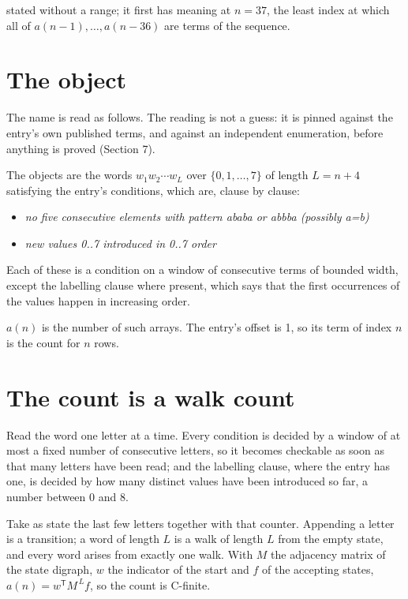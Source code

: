 \documentclass[11pt]{article}
\theoremstyle{definition}
\begin{document}
stated without a range; it first has meaning at $n = 37$, the least index at which all of $a(n-1),\dots,a(n-36)$ are terms of the sequence.

\section{The object}

The name is read as follows. The reading is not a guess: it is pinned against the entry's own published terms, and against an independent enumeration, before anything is proved (Section 7).

The objects are the words $w_1 w_2 \cdots w_L$ over $\{0,1,\dots,7\}$ of length $L = n + 4$ satisfying the entry's conditions, which are, clause by clause:

\begin{itemize}

\item {\itshape no five consecutive elements with pattern ababa or abbba (possibly a=b)}

\item {\itshape new values 0..7 introduced in 0..7 order}

\end{itemize}

Each of these is a condition on a window of consecutive terms of bounded width, except the labelling clause where present, which says that the first occurrences of the values happen in increasing order.

$a(n)$ is the number of such arrays. The entry's offset is 1, so its term of index $n$ is the count for $n$ rows.

\section{The count is a walk count}

Read the word one letter at a time. Every condition is decided by a window of at most a fixed number of consecutive letters, so it becomes checkable as soon as that many letters have been read; and the labelling clause, where the entry has one, is decided by how many distinct values have been introduced so far, a number between $0$ and 8.

Take as state the last few letters together with that counter. Appending a letter is a transition; a word of length $L$ is a walk of length $L$ from the empty state, and every word arises from exactly one walk. With $M$ the adjacency matrix of the state digraph, $w$ the indicator of the start and $f$ of the accepting states, $a(n) = w^{\mathsf T}M^{\,L}f$, so the count is C-finite.
\end{document}
